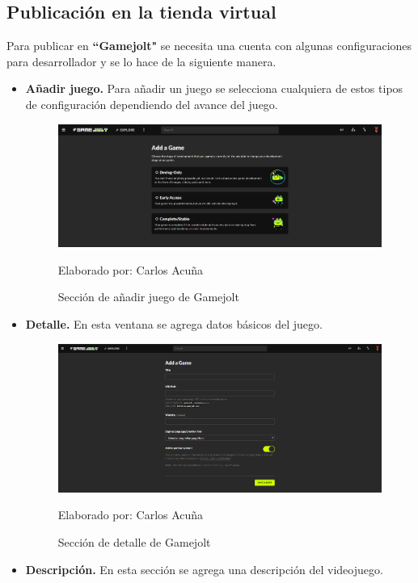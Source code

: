 \documentclass[a4paper, openright, 12pt]{report}
\begin{document}
\subsection*{Publicación en la tienda virtual}
Para publicar en \textbf{``Gamejolt"} se necesita una cuenta con algunas configuraciones para desarrollador y se lo hace de la siguiente manera.
\begin{itemize}
\item \textbf{Añadir juego.} Para añadir un juego se selecciona cualquiera de estos tipos de configuración dependiendo del avance del juego.

\begin{figure}[h]
\captionsetup{justification=centering,margin=2cm}
\includegraphics[scale=0.3]{u01}
\centering
\caption{Sección de añadir juego de Gamejolt}
Elaborado por: Carlos Acuña
\label{fig:u01}
\end{figure}

\item \textbf{Detalle.} En esta ventana se agrega datos básicos del juego.

\begin{figure}[h]
\captionsetup{justification=centering,margin=2cm}
\includegraphics[scale=0.3]{u02}
\centering
\caption{Sección de detalle de Gamejolt}
Elaborado por: Carlos Acuña
\label{fig:u02}
\end{figure}
\clearpage
\item \textbf{Descripción.} En esta sección se agrega una descripción del videojuego.


\end{itemize}
\end{document}

